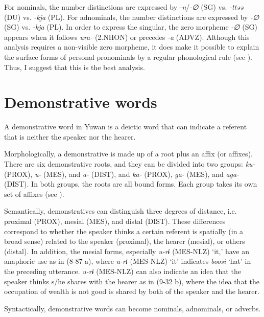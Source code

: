 For nominals, the number distinctions are expressed by -\textit{n}/\textit{{}-∅} (SG) vs. \textit{{}-ttəə} (DU) vs. \textit{{}-kja} (PL). For adnominals, the number distinctions are expressed by \textit{{}-∅} (SG) vs. \textit{{}-kja} (PL). In order to express the singular, the zero morpheme \textit{{}-∅} (SG) appears when it follows \textit{ura-} (2.NHON) or precedes \textit{{}-a} (ADVZ). Although this analysis requires a non-visible zero morpheme, it does make it possible to explain the surface forms of personal pronominals by a regular phonological rule (see ). Thus, I suggest that this is the best analysis.

\section{Demonstrative words}

A demonstrative word in Yuwan is a deictic word that can indicate a referent that is neither the speaker nor the hearer.

  Morphologically, a demonstrative is made up of a root plus an affix (or affixes). There are six demonstrative roots, and they can be divided into two groups:  \textit{ku-} (PROX), \textit{u-} (MES), and \textit{a-} (DIST), and  \textit{ka-} (PROX), \textit{ga-} (MES), and \textit{aga-} (DIST). In both groups, the roots are all bound forms. Each group takes its own set of affixes (see ).

  Semantically, demonstratives can distinguish three degrees of distance, i.e. proximal (PROX), mesial (MES), and distal (DIST). These differences correspond to whether the speaker thinks a certain referent is spatially (in a broad sense) related to the speaker (proximal), the hearer (mesial), or others (distal). In addition, the mesial forms, especially \textit{u-rɨ} (MES-NLZ) ‘it,’ have an anaphoric use as in (8-87 a), where \textit{u-rɨ} (MES-NLZ) ‘it’ indicates \textit{boosi} ‘hat’ in the preceding utterance. \textit{u-rɨ} (MES-NLZ) can also indicate an idea that the speaker thinks s/he shares with the hearer as in (9-32 b), where the idea that the occupation of wealth is not good is shared by both of the speaker and the hearer.

Syntactically, demonstrative words can become nominals, adnominals, or adverbs.

